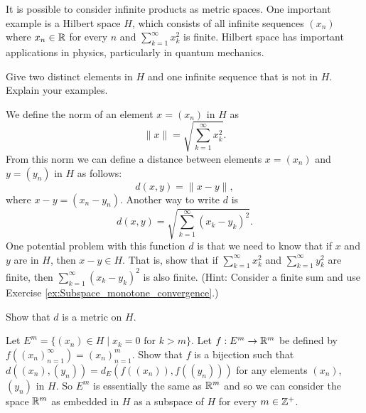 \item It is possible to consider infinite products as metric spaces. One important example is a Hilbert space $H$, which consists of all infinite sequences $(x_n)$ where $x_n \in \mathbb{R}$ for every $n$ and $\sum_{k = 1}^{\infty} x_k^2$ is finite. Hilbert space has important applications in physics, particularly in quantum mechanics. 
\ba
\item Give two distinct elements in $H$ and one infinite sequence that is not in $H$. Explain your examples. 

\item We define the norm of an element $x = (x_n)$ in $H$ as 
\[\lVert x\rVert = \sqrt{\sum_{k=1}^{\infty} x_k^2}.\]
From this norm we can define a distance between elements $x = (x_n)$ and $y = (y_n)$ in $H$ as follows:
\[d(x,y) = \lVert x-y \rVert,\]
where $x-y = (x_n-y_n)$. Another way to write $d$ is 
\[d(x,y) = \sqrt{\sum_{k=1}^{\infty} (x_k-y_k)^2}.\]
One potential problem with this function $d$ is that we need to know that if $x$ and $y$ are in $H$, then $x-y \in H$. That is, show that if $\sum_{k=1}^{\infty} x_k^2$ and $\sum_{k=1}^{\infty} y_k^2$ are finite, then $\sum_{k=1}^{\infty} (x_k-y_k)^2$ is also finite. (Hint: Consider a finite sum and use Exercise \ref{ex:Subspace_monotone_convergence}.)

\item Show that $d$ is a metric on $H$.

\item Let $E^m = \{(x_n) \in H \mid x_k = 0 \text{ for  } k > m\}$. Let $f: E^m \to \mathbb{R}^m$ be defined by $f((x_n)_{n=1}^{\infty}) = (x_n)_{n=1}^m$. Show that $f$ is a bijection such that $d((x_n), (y_n)) = d_E(f((x_n)), f((y_n)))$ for any elements $(x_n)$, $(y_n)$ in $H$. So $E^m$ is essentially the same as $\mathbb{R}^m$ and so we can consider the space $\mathbb{R}^m$ as embedded in $H$ as a subspace of $H$ for every $m \in \mathbb{Z}^+$. 
 
\ea

